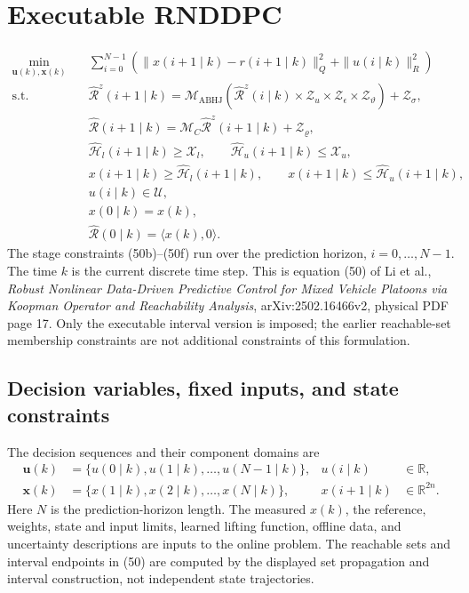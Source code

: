 \documentclass{article}
\begin{document}
\section*{Executable RNDDPC}
\begin{align}
\min_{\mathbf{u}(k),\mathbf{x}(k)}\quad &\sum_{i=0}^{N-1}\left(\|x(i+1\mid k)-r(i+1\mid k)\|_Q^2+\|u(i\mid k)\|_R^2\right) \tag{50a}\\
\text{s.t.}\quad
&\hat{\mathcal{R}}^z(i+1\mid k)=\mathcal{M}_{\mathrm{ABHJ}}\left(\hat{\mathcal{R}}^z(i\mid k)\times\mathcal{Z}_u\times\mathcal{Z}_{\epsilon}\times\mathcal{Z}_{\vartheta}\right)+\mathcal{Z}_{\sigma}, \tag{50b}\\
&\hat{\mathcal{R}}(i+1\mid k)=\mathcal{M}_C\hat{\mathcal{R}}^z(i+1\mid k)+\mathcal{Z}_{\varrho}, \tag{50c}\\
&\hat{\mathcal{H}}_l(i+1\mid k)\geq\mathcal{X}_l,\qquad \hat{\mathcal{H}}_u(i+1\mid k)\leq\mathcal{X}_u, \tag{50d}\\
&x(i+1\mid k)\geq\hat{\mathcal{H}}_l(i+1\mid k),\qquad x(i+1\mid k)\leq\hat{\mathcal{H}}_u(i+1\mid k), \tag{50e}\\
&u(i\mid k)\in\mathcal{U}, \tag{50f}\\
&x(0\mid k)=x(k), \tag{50g}\\
&\hat{\mathcal{R}}(0\mid k)=\langle x(k),0\rangle. \tag{50h}
\end{align}
The stage constraints (50b)--(50f) run over the prediction horizon, $i=0,\ldots,N-1$. The time $k$ is the current discrete time step. This is equation (50) of Li et al., \emph{Robust Nonlinear Data-Driven Predictive Control for Mixed Vehicle Platoons via Koopman Operator and Reachability Analysis}, arXiv:2502.16466v2, physical PDF page 17. Only the executable interval version is imposed; the earlier reachable-set membership constraints are not additional constraints of this formulation.

\subsection*{Decision variables, fixed inputs, and state constraints}
The decision sequences and their component domains are
\[
\begin{aligned}
\mathbf{u}(k)&=\{u(0\mid k),u(1\mid k),\ldots,u(N-1\mid k)\}, &u(i\mid k)&\in\mathbb{R},\\
\mathbf{x}(k)&=\{x(1\mid k),x(2\mid k),\ldots,x(N\mid k)\}, &x(i+1\mid k)&\in\mathbb{R}^{2n}.
\end{aligned}
\]
Here $N$ is the prediction-horizon length. The measured $x(k)$, the reference, weights, state and input limits, learned lifting function, offline data, and uncertainty descriptions are inputs to the online problem. The reachable sets and interval endpoints in (50) are computed by the displayed set propagation and interval construction, not independent state trajectories.
\end{document}
